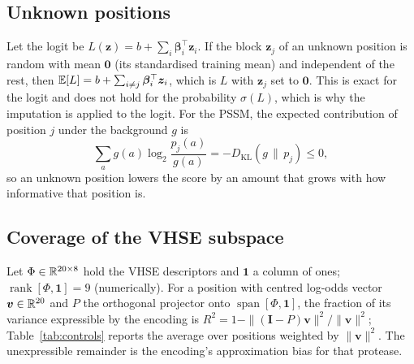 \subsection{Unknown positions}
Let the logit be $L(\bm z)=b+\sum_i\bm\beta_i^{\top}\bm z_i$. If the block $\bm z_j$ of an unknown position is random with mean $\bm 0$ (its standardised training mean) and independent of the rest, then $\mathbb{E}[L]=b+\sum_{i\ne j}\bm\beta_i^{\top}\bm z_i$, which is $L$ with $\bm z_j$ set to $\bm 0$. This is exact for the logit and does not hold for the probability $\sigma(L)$, which is why the imputation is applied to the logit. For the PSSM, the expected contribution of position $j$ under the background $g$ is
\begin{equation}
\sum_a g(a)\log_2\frac{p_j(a)}{g(a)}=-D_{\mathrm{KL}}(g\,\|\,p_j)\le0,
\end{equation}
so an unknown position lowers the score by an amount that grows with how informative that position is.

\subsection{Coverage of the VHSE subspace}
Let $\Phi\in\mathbb{R}^{20\times8}$ hold the VHSE descriptors and $\bm 1$ a column of ones; $\operatorname{rank}[\Phi,\bm1]=9$ (numerically). For a position with centred log-odds vector $\bm v\in\mathbb{R}^{20}$ and $P$ the orthogonal projector onto $\operatorname{span}[\Phi,\bm1]$, the fraction of its variance expressible by the encoding is $R^2=1-\|(\bm I-P)\bm v\|^2/\|\bm v\|^2$; Table~\ref{tab:controls} reports the average over positions weighted by $\|\bm v\|^2$. The unexpressible remainder is the encoding's approximation bias for that protease.
